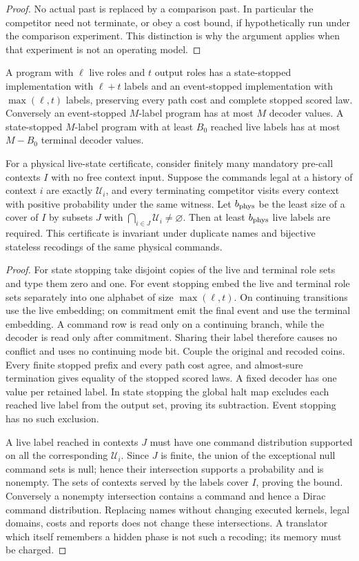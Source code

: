 \begin{proof}
No actual past is replaced by a comparison past. In particular the competitor need not terminate, or obey a cost bound, if hypothetically run under the comparison experiment. This distinction is why the argument applies when that experiment is not an operating model.
\end{proof}

\begin{lemma}\label{lem:roles}
A program with $\ell$ live roles and $t$ output roles has a state-stopped implementation with $\ell+t$ labels and an event-stopped implementation with $\max(\ell,t)$ labels, preserving every path cost and complete stopped scored law. Conversely an event-stopped $M$-label program has at most $M$ decoder values. A state-stopped $M$-label program with at least $B_0$ reached live labels has at most $M-B_0$ terminal decoder values.

For a physical live-state certificate, consider finitely many mandatory pre-call contexts $I$ with no free context input. Suppose the commands legal at a history of context $i$ are exactly $\mathcal U_i$, and every terminating competitor visits every context with positive probability under the same witness. Let $b_{\rm phys}$ be the least size of a cover of $I$ by subsets $J$ with $\bigcap_{i\in J}\mathcal U_i\ne\varnothing$. Then at least $b_{\rm phys}$ live labels are required. This certificate is invariant under duplicate names and bijective stateless recodings of the same physical commands.
\end{lemma}
\begin{proof}
For state stopping take disjoint copies of the live and terminal role sets and type them zero and one. For event stopping embed the live and terminal role sets separately into one alphabet of size $\max(\ell,t)$. On continuing transitions use the live embedding; on commitment emit the final event and use the terminal embedding. A command row is read only on a continuing branch, while the decoder is read only after commitment. Sharing their label therefore causes no conflict and uses no continuing mode bit. Couple the original and recoded coins. Every finite stopped prefix and every path cost agree, and almost-sure termination gives equality of the stopped scored laws. A fixed decoder has one value per retained label. In state stopping the global halt map excludes each reached live label from the output set, proving its subtraction. Event stopping has no such exclusion.

A live label reached in contexts $J$ must have one command distribution supported on all the corresponding $\mathcal U_i$. Since $J$ is finite, the union of the exceptional null command sets is null; hence their intersection supports a probability and is nonempty. The sets of contexts served by the labels cover $I$, proving the bound. Conversely a nonempty intersection contains a command and hence a Dirac command distribution. Replacing names without changing executed kernels, legal domains, costs and reports does not change these intersections. A translator which itself remembers a hidden phase is not such a recoding; its memory must be charged.
\end{proof}


